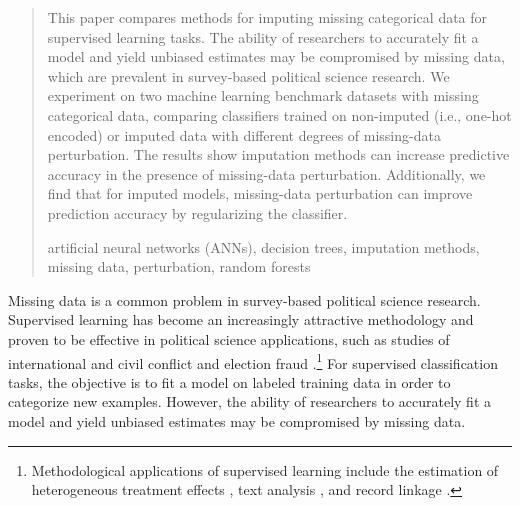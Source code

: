 \documentclass[10pt]{book}
\theoremstyle{definition}
\begin{document}
\begin{quotation}
This paper compares methods for imputing missing categorical data for supervised learning tasks. The ability of researchers to accurately fit a model and yield unbiased estimates may be compromised by missing data, which are prevalent in survey-based political science research. We experiment on two machine learning benchmark datasets with missing categorical data, comparing classifiers trained on non-imputed (i.e., one-hot encoded) or imputed data with different degrees of missing-data perturbation. The results show imputation methods can increase predictive accuracy in the presence of missing-data perturbation. Additionally, we find that for imputed models, missing-data perturbation can improve prediction accuracy by regularizing the classifier. \par

\vspace{9pt}
artificial neural networks (ANNs), decision trees, imputation methods, missing data, perturbation, random forests
\par
\end{quotation}\par



\def\thefigure{\arabic{figure}}
\def\thetable{\arabic{table}}

\fontsize{12}{14pt plus.8pt minus .6pt}\selectfont

\newpage %

\setcounter{chapter}{1}
\setcounter{equation}{0} %
\setcounter{page}{1} %

Missing data is a common problem in survey-based political science research. Supervised learning has become an increasingly attractive methodology and proven to be effective in political science applications, such as studies of international and civil conflict \citep{beck2000,de2004,hill2014,muchlinski2016} and election fraud \citep{cantu2011,montgomery2015}.\footnote{Methodological applications of supervised learning include the estimation of heterogeneous treatment effects \citep{imai2011,green2012, imai2013, grimmer2014}, text analysis \citep{quinn2010,hopkins2010,grimmer2013,lauderdale2014,wilkerson2015}, and record linkage \citep{giraud2010}.} For supervised classification tasks, the objective is to fit a model on labeled training data in order to categorize new examples. However, the ability of researchers to accurately fit a model and yield unbiased estimates may be compromised by missing data. 
\end{document}
